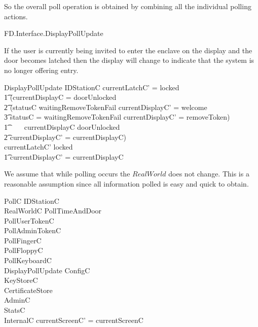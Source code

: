 So the overall poll operation is obtained by combining all the
individual polling actions.

\begin{traceunit}{FD.Interface.DisplayPollUpdate}
\end{traceunit}

If the user is
currently being invited to enter the enclave on the display and the 
door becomes latched then the display will change to indicate that the
system is no longer offering entry.

\begin{schema}{DisplayPollUpdate}
        \Delta IDStationC
\where
        currentLatchC' = locked
\\ \t1  \land (currentDisplayC = doorUnlocked 
\\ \t2  \land        (statusC \neq waitingRemoveTokenFail \land
        currentDisplayC' = welcome
\\ \t3  \lor statusC = waitingRemoveTokenFail \land currentDisplayC' =
removeToken)
\\ \t1  ~~~~\lor currentDisplayC \neq doorUnlocked 
\\ \t2  \land currentDisplayC' = currentDisplayC)
\\      \lor
        currentLatchC' \neq locked 
\\ \t1 \land currentDisplayC' = currentDisplayC
\end{schema}

We assume that while polling occurs the $RealWorld$ does not
change. This is a reasonable assumption since all information polled
is easy and quick to obtain.

\begin{schema}{PollC}
	\Delta IDStationC
\\      \Xi RealWorldC
\also
	PollTimeAndDoor
\\	PollUserTokenC
\\	PollAdminTokenC
\\	PollFingerC
\\      PollFloppyC
\\      PollKeyboardC
\\      DisplayPollUpdate
\also
        \Xi ConfigC
\\      \Xi KeyStoreC
\\      \Xi CertificateStore
\\      \Xi AdminC
\\      \Xi StatsC
\\      \Xi InternalC
\where
        currentScreenC' = currentScreenC
\end{schema}

